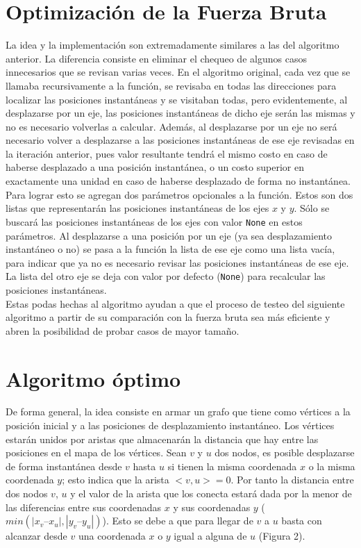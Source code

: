 \documentclass[a4paper,12pt,twocolumn]{article}
\begin{document}
	\section{Optimización de la Fuerza Bruta}
		La idea y la implementación son extremadamente similares a las del algoritmo anterior. La diferencia consiste en eliminar el chequeo de algunos casos innecesarios que se revisan varias veces. En el algoritmo original, cada vez que se llamaba recursivamente a la función, se revisaba en todas las direcciones para localizar las posiciones instantáneas y se visitaban todas, pero evidentemente, al desplazarse por un eje, las posiciones instantáneas de dicho eje serán las mismas y no es necesario volverlas a calcular. Además, al desplazarse por un eje no será necesario volver a desplazarse a las posiciones instantáneas de ese eje revisadas en la iteración anterior, pues valor resultante tendrá el mismo costo en caso de haberse desplazado a una posición instantánea, o un costo superior en exactamente una unidad en caso de haberse desplazado de forma no instantánea.\\
		
		Para lograr esto se agregan dos parámetros opcionales a la función. Estos son dos listas que representarán las posiciones instantáneas de los ejes $x$ y $y$. Sólo se buscará las posiciones instantáneas de los ejes con valor \texttt{\ttfamily None} en estos parámetros. Al desplazarse a una posición por un eje (ya sea desplazamiento instantáneo o no) se pasa a la función la lista de ese eje como una lista vacía, para indicar que ya no es necesario revisar las posiciones instantáneas de ese eje. La lista del otro eje se deja con valor por defecto (\texttt{\ttfamily None}) para recalcular las posiciones instantáneas.\\
	
		Estas podas hechas al algoritmo ayudan a que el proceso de testeo del siguiente algoritmo a partir de su comparación con la fuerza bruta sea más eficiente y abren la posibilidad de probar casos de mayor tamaño.
	
	\section{Algoritmo óptimo}

		De forma general, la idea consiste en armar un grafo que tiene como vértices a la posición inicial y a las posiciones de desplazamiento instantáneo. Los vértices estarán unidos por aristas que almacenarán la distancia que hay entre las posiciones en el mapa de los vértices. Sean $v$ y $u$ dos nodos, es posible desplazarse de forma instantánea desde $v$ hasta $u$ si tienen la misma coordenada $x$ o la misma coordenada $y$; esto indica que la arista $<v, u> = 0$. Por tanto la distancia entre dos nodos $v$, $u$ y el valor de la arista que los conecta estará dada por la menor de las diferencias entre sus coordenadas $x$ y sus coordenadas $y$ ($min( |x_v – x_u|, |y_v – y_u|)$). Esto se debe a que para llegar de $v$ a $u$ basta con alcanzar desde $v$ una coordenada $x$ o $y$ igual a alguna de $u$ (Figura 2).\\
		
\end{document}
